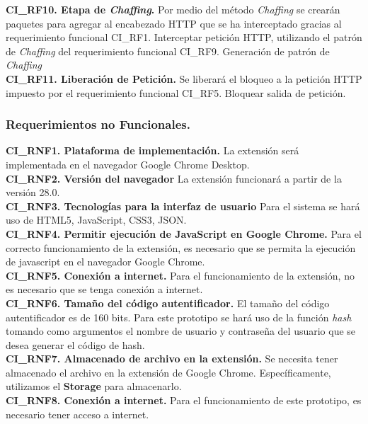 \documentclass[12pt, a4paper, titlepage]{report}
\begin{document}
{				\textbf{CI\_RF10. Etapa de \textit{Chaffing}.} Por medio del m\'etodo \textit{Chaffing} se crearán paquetes para agregar al encabezado HTTP que se ha interceptado gracias al requerimiento funcional CI\_RF1. Interceptar petición HTTP, utilizando el patrón de \textit{Chaffing} del requerimiento funcional CI\_RF9. Generación de patrón de \textit{Chaffing}\\
                    
                \textbf{CI\_RF11. Liberaci\'on de Petición.} Se liberar\'a el bloqueo a la petici\'on HTTP impuesto por el requerimiento funcional CI\_RF5. Bloquear salida de petición.
                
		        }
				
				\subsubsection{Requerimientos no Funcionales.}
				{\setlength{\parindent}{12pt}
				
				\textbf{CI\_RNF1. Plataforma de implementación.} La extensión será implementada en el navegador Google Chrome Desktop.\\
				
				\textbf{CI\_RNF2. Versión del navegador} La extensión funcionará a partir de la versión 28.0.\\
				
				\textbf{CI\_RNF3. Tecnologías para la interfaz de usuario} Para el sistema se hará uso de HTML5, JavaScript, CSS3, JSON.\\
				
				\textbf{CI\_RNF4. Permitir ejecución de JavaScript en Google Chrome.} Para el correcto funcionamiento de la extensión, es necesario que se permita la ejecución de javascript en el navegador Google Chrome.\\
				
				\textbf{CI\_RNF5. Conexión a internet.} Para el funcionamiento de la extensión, no es necesario que se tenga conexión a internet.\\
				
				\textbf{CI\_RNF6. Tamaño del código autentificador.} El tamaño del código autentificador es de 160 bits. Para este prototipo se hará uso de la función \textit{hash} tomando como argumentos el nombre de usuario y contraseña del usuario que se desea generar el código de hash.\\
				
				\textbf{CI\_RNF7. Almacenado de archivo en la extensión.} Se necesita tener almacenado el archivo en la extensión de Google Chrome. Específicamente, utilizamos el \textbf{Storage} para almacenarlo. \\
				
				\textbf{CI\_RNF8. Conexión a internet.} Para el funcionamiento de este prototipo, es necesario tener acceso a internet. \\
				}
		    
\end{document}
